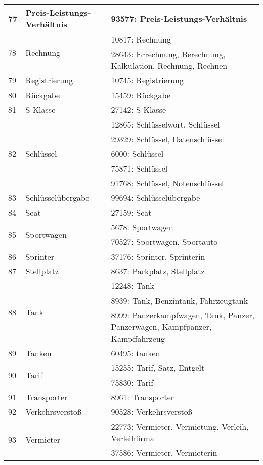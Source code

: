 \begin{longtable}{|m{1cm}|m{4.5cm}|m{7.5cm}|}
	\hline
	77 & Preis-Leistungs-Verhältnis & 93577: Preis-Leistungs-Verhältnis\\
	\hline
	\multirow{2}{*}{78} & \multirow{2}{*}{Rechnung} & 10817: Rechnung\\
	& & 28643: Errechnung, Berechnung, Kalkulation, Rechnung, Rechnen\\
	\hline
	79 & Registrierung & 10745: Registrierung\\
	\hline
	80 & Rückgabe & 15459: Rückgabe\\
	\hline
	81 & S-Klasse & 27142: S-Klasse\\
	\hline
	\multirow{5}{*}{82} & \multirow{5}{*}{Schlüssel} & 12865: Schlüsselwort, Schlüssel\\
	& & 29329: Schlüssel, Datenschlüssel\\
	\hline
	& & 6000: Schlüssel\\
	\hline
	& & 75871: Schlüssel\\
	\hline
	& & 91768: Schlüssel, Notenschlüssel\\
	\hline
	83 & Schlüsselübergabe & 99694: Schlüsselübergabe\\
	\hline
	84 & Seat & 27159: Seat\\
	\hline
	\multirow{2}{*}{85} & \multirow{2}{*}{Sportwagen} & 5678: Sportwagen\\
	& & 70527: Sportwagen, Sportauto\\
	\hline
	86 & Sprinter & 37176: Sprinter, Sprinterin\\
	\hline
	87 & Stellplatz & 8637: Parkplatz, Stellplatz\\
	\hline
	\multirow{3}{*}{88} & \multirow{3}{*}{Tank} & 12248: Tank\\
	& & 8939: Tank, Benzintank, Fahrzeugtank\\
	\hline
	& & 8999: Panzerkampfwagen, Tank, Panzer, Panzerwagen, Kampfpanzer, Kampffahrzeug\\
	\hline
	89 & Tanken & 60495: tanken\\
	\hline
	\multirow{2}{*}{90} & \multirow{2}{*}{Tarif} & 15255: Tarif, Satz, Entgelt\\
	& & 75830: Tarif\\
	\hline
	91 & Transporter & 8961: Transporter\\
	\hline
	92 & Verkehrsverstoß & 90528: Verkehrsverstoß\\
	\hline
	\multirow{2}{*}{93} & \multirow{2}{*}{Vermieter} & 22773: Vermieter, Vermietung, Verleih, Verleihfirma\\
	& & 37586: Vermieter, Vermieterin\\

\end{longtable}
